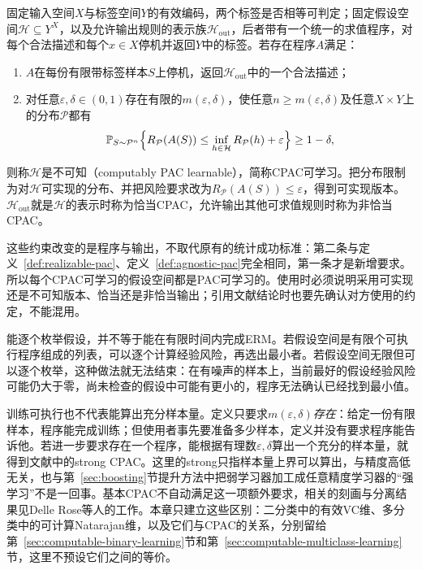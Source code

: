 \begin{definition}[可计算PAC学习]
\label{def:computable-pac-learning}
固定输入空间$X$与标签空间$Y$的有效编码，两个标签是否相等可判定；固定假设空间$\mathcal H\subseteq Y^X$，以及允许输出规则的表示族$\mathcal H_{\mathrm{out}}$，后者带有一个统一的求值程序，对每个合法描述和每个$x\in X$停机并返回$Y$中的标签。若存在程序$A$满足：
\begin{enumerate}
 \item $A$在每份有限带标签样本$S$上停机，返回$\mathcal H_{\mathrm{out}}$中的一个合法描述；
 \item 对任意$\varepsilon,\delta\in(0,1)$存在有限的$m(\varepsilon,\delta)$，使任意$n\geq m(\varepsilon,\delta)$及任意$X\times Y$上的分布$\mathcal P$都有
 \[
  \mathbb P_{S\sim\mathcal P^n}\Bigl\{
  R_{\mathcal P}(A(S))\leq\inf_{h\in\mathcal H}R_{\mathcal P}(h)+\varepsilon
  \Bigr\}\geq1-\delta,
 \]
\end{enumerate}
则称$\mathcal H$是不可知（computably PAC learnable），简称CPAC可学习。把分布限制为对$\mathcal H$可实现的分布、并把风险要求改为$R_{\mathcal P}(A(S))\leq\varepsilon$，得到可实现版本。$\mathcal H_{\mathrm{out}}$就是$\mathcal H$的表示时称为恰当CPAC，允许输出其他可求值规则时称为非恰当CPAC。
\end{definition}

这些约束改变的是程序与输出，不取代原有的统计成功标准：第二条与定义~\ref{def:realizable-pac}、定义~\ref{def:agnostic-pac}完全相同，第一条才是新增要求。所以每个CPAC可学习的假设空间都是PAC可学习的。使用时必须说明采用可实现还是不可知版本、恰当还是非恰当输出；引用文献结论时也要先确认对方使用的约定，不能混用。

能逐个枚举假设，并不等于能在有限时间内完成ERM。若假设空间是有限个可执行程序组成的列表，可以逐个计算经验风险，再选出最小者。若假设空间无限但可以逐个枚举，这种做法就无法结束：在有噪声的样本上，当前最好的假设经验风险可能仍大于零，尚未检查的假设中可能有更小的，程序无法确认已经找到最小值。

训练可执行也不代表能算出充分样本量。定义只要求$m(\varepsilon,\delta)$\emph{存在}：给定一份有限样本，程序能完成训练；但使用者事先要准备多少样本，定义并没有要求程序能告诉他。若进一步要求存在一个程序，能根据有理数$\varepsilon,\delta$算出一个充分的样本量，就得到文献中的strong CPAC。这里的strong只指样本量上界可以算出，与精度高低无关，也与第~\ref{sec:boosting}节提升方法中把弱学习器加工成任意精度学习器的“强学习”不是一回事。基本CPAC不自动满足这一项额外要求，相关的刻画与分离结果见Delle Rose等人的工作。本章只建立这些区别：二分类中的有效VC维、多分类中的可计算Natarajan维，以及它们与CPAC的关系，分别留给第~\ref{sec:computable-binary-learning}节和第~\ref{sec:computable-multiclass-learning}节，这里不预设它们之间的等价。

